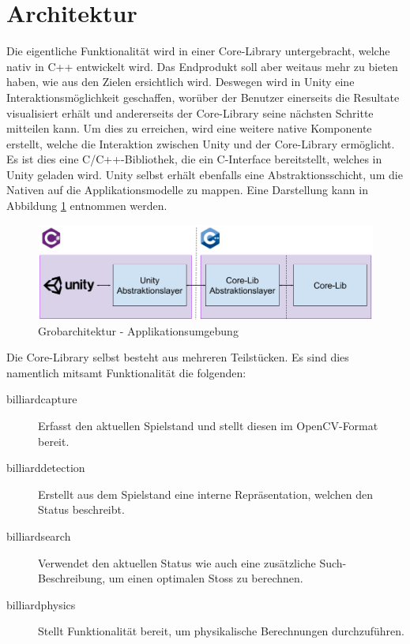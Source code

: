 \section{Architektur}
Die eigentliche Funktionalität wird in einer Core-Library untergebracht, welche nativ in C++ entwickelt wird. Das
Endprodukt soll aber weitaus mehr zu bieten haben, wie aus den Zielen ersichtlich wird. Deswegen wird in Unity eine
Interaktionsmöglichkeit geschaffen, worüber der Benutzer einerseits die Resultate visualisiert erhält und
andererseits der Core-Library seine nächsten Schritte mitteilen kann. Um dies zu erreichen, wird eine weitere native
Komponente erstellt, welche die Interaktion zwischen Unity und der Core-Library ermöglicht. Es ist dies eine C/C++-Bibliothek,
die ein C-Interface bereitstellt, welches in Unity geladen wird. Unity selbst erhält ebenfalls eine Abstraktionsschicht,
um die Nativen auf die Applikationsmodelle zu mappen. Eine Darstellung kann in Abbildung \ref{fig:top-level-architecture} entnommen
werden.

\begin{figure}[h!]
    \begin{center}
        \includegraphics[width=0.8\linewidth]{../common/03_billiard_ai/resources/00_top_level_architecture.png}
    \end{center}
    \caption{Grobarchitektur - Applikationsumgebung}
    \label{fig:top-level-architecture}
\end{figure}

Die Core-Library selbst besteht aus mehreren Teilstücken. Es sind dies namentlich mitsamt Funktionalität die
folgenden:
\begin{description}
    \item[billiard\textunderscore capture] Erfasst den aktuellen Spielstand und stellt diesen im OpenCV-Format bereit.
    \item[billiard\textunderscore detection] Erstellt aus dem Spielstand eine interne Repräsentation, welchen den Status beschreibt.
    \item[billiard\textunderscore search] Verwendet den aktuellen Status wie auch eine zusätzliche Such-Beschreibung, um einen optimalen
    Stoss zu berechnen.
    \item[billiard\textunderscore physics] Stellt Funktionalität bereit, um physikalische Berechnungen durchzuführen.
\end{description}


